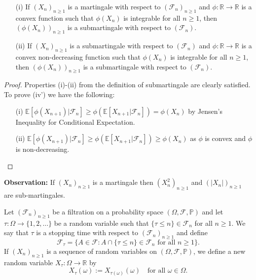 \begin{theorem}
\begin{enumerate}
    \item[(i)] If $(X_n)_{n\geq 1}$ is a martingale with respect to $(\mathcal{F}_n)_{n \geq 1}$ and $\phi: \mathbb{R} \to \mathbb{R}$ is a convex function such that $\phi(X_n)$ is integrable for all $n \geq 1$, then $(\phi(X_n))_{n \geq 1}$ is a submartingale with respect to $(\mathcal{F}_n)$.
    \item[(ii)] If $(X_n)_{n\geq 1}$ is a submartingale with respect to $(\mathcal{F}_n)$ and $\phi: \mathbb{R} \to \mathbb{R}$ is a convex non-decreasing function such that $\phi(X_n)$ is integrable for all $n \geq 1$, then $(\phi(X_n))_{n\geq 1}$ is a submartingale with respect to $(\mathcal{F}_n)$.
\end{enumerate}
\end{theorem}

\begin{proof}
Properties (i)-(ii) from the definition of submartingale are clearly satisfied. To prove (iv') we have the following:
\begin{enumerate}
    \item[(i)] $\mathbb{E}[\phi(X_{n+1}) | \mathcal{F}_n] \geq \phi(\mathbb{E}[X_{n+1} | \mathcal{F}_n]) = \phi(X_n)$ by Jensen's Inequality for Conditional Expectation.
    \item[(ii)] $\mathbb{E}[\phi(X_{n+1}) | \mathcal{F}_n] \geq \phi(\mathbb{E}[X_{n+1} | \mathcal{F}_n]) \geq \phi(X_n)$ as $\phi$ is convex and $\phi$ is non-decreasing.
\end{enumerate}
\end{proof}
\textbf{Observation:}
If $(X_n)_{n \geq 1}$ is a martingale then $(X_n^2)_{n \geq 1}$ and $(|X_n|)_{n \geq 1}$ are sub-martingales.


\begin{definition}
Let $(\mathcal{F}_n)_{n \geq 1}$ be a filtration on a probability space $(\Omega, \mathcal{F}, \mathbb{P})$ and let $\tau: \Omega \to \{1, 2, \ldots\}$ be a random variable such that $\{\tau \leq n\} \in \mathcal{F}_n$ for all $n \geq 1$. We say that $\tau$ is a stopping time with respect to $(\mathcal{F}_n)_{n \geq 1}$ and define 
\[\mathcal{F}_\tau = \{A \in \mathcal{F} : A \cap \{\tau \leq n\} \in \mathcal{F}_n \text{ for all } n \geq 1\}.\]
If $(X_n)_{n \geq 1}$ is a sequence of random variables on $(\Omega, \mathcal{F}, \mathbb{P})$, we define a new random variable $X_\tau: \Omega \to \mathbb{R}$ by
\[X_\tau(\omega) := X_{\tau(\omega)}(\omega) \quad \text{for all } \omega \in \Omega.\]
\end{definition}


